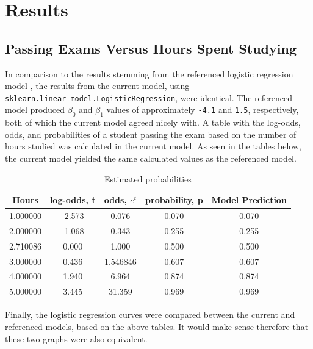 \documentclass[journal]{IEEEtran}
\begin{document}
\section{Results}

\subsection{Passing Exams Versus Hours Spent Studying}

In comparison to the results stemming from the referenced logistic regression model \cite{b3}, the results from the current model, using \lstinline{sklearn.linear_model.LogisticRegression}, were identical. The referenced model produced $\beta_0$ and $\beta_1$ values of approximately \lstinline{-4.1} and \lstinline{1.5}, respectively, both of which the current model agreed nicely with. A table with the log-odds, odds, and probabilities of a student passing the exam based on the number of hours studied was calculated in the current model. As seen in the tables below, the current model yielded the same calculated values as the referenced model.

\begin{table}[h!]
\centering
\begin{tabular}{ c c c c c }
    Hours &	log-odds, t &	odds, \(e^t\) &	probability, p &	Model Prediction \\ 
\hline
1.000000 &	-2.573 &	0.076 &	0.070 &	0.070 \\
2.000000 &	-1.068 &	0.343 &	0.255 &	0.255 \\
2.710086 &	0.000 &	1.000 &	0.500 &	0.500 \\
3.000000 &	0.436 &	1.546846 &	0.607 &	0.607 \\
4.000000 &	1.940 &	6.964 &	0.874 &	0.874 \\
5.000000 &	3.445 &	31.359 &	0.969 &	0.969
\end{tabular}
\caption{Estimated probabilities}
\label{table:log-odds-table}
\end{table}

Finally, the logistic regression curves were compared between the current and referenced models, based on the above tables. It would make sense therefore that these two graphs were also equivalent.
\end{document}
